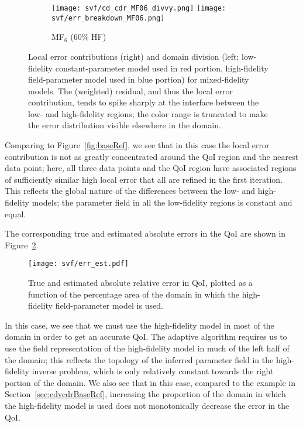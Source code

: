 \begin{figure}[h]
\begin{subfigure}[b]{\textwidth}
	\centering
	\texttt{[image: svf/cd\_cdr\_MF06\_divvy.png]}
  \texttt{[image: svf/err\_breakdown\_MF06.png]}
  \vspace{-0.7\baselineskip}
  \caption{MF$_6$ ($60\%$ HF)}
\end{subfigure}
\caption{Local error contributions (right) and domain division (left; low-fidelity constant-parameter model used in red portion, high-fidelity field-parameter model used in blue portion) for mixed-fidelity models. The (weighted) residual, and thus the local error contribution, tends to spike sharply at the interface between the low- and high-fidelity regions; the color range is truncated to make the error distribution visible elsewhere in the domain.}
\label{fig:svfRef}
\end{figure}
%
Comparing to Figure~\ref{fig:baseRef}, we see that in this case the local error contribution is not as greatly concentrated around the QoI region and the nearest data point; here, all three data points and the QoI region have associated regions of sufficiently similar high local error that all are refined in the first iteration. This reflects the global nature of the differences between the low- and high-fidelity models; the parameter field in all the low-fidelity regions is constant and equal. 

The corresponding true and estimated absolute errors in the QoI are shown in Figure~\ref{fig:svfErr}.
%
\begin{figure}[h]
\centering
\texttt{[image: svf/err\_est.pdf]}
\caption{True and estimated absolute relative error in QoI, plotted as a function of the percentage area of the domain in which the high-fidelity field-parameter model is used.}
\label{fig:svfErr}
\end{figure}
%
In this case, we see that we must use the high-fidelity model in most of the domain in order to get an accurate QoI. The adaptive algorithm requires us to use the field representation of the high-fidelity model in much of the left half of the domain; this reflects the topology of the inferred parameter field in the high-fidelity inverse problem, which is only relatively constant towards the right portion of the domain. We also see that in this case, compared to the example in Section~\ref{sec:cdvcdrBaseRef}, increasing the proportion of the domain in which the high-fidelity model is used does not monotonically decrease the error in the QoI. 
